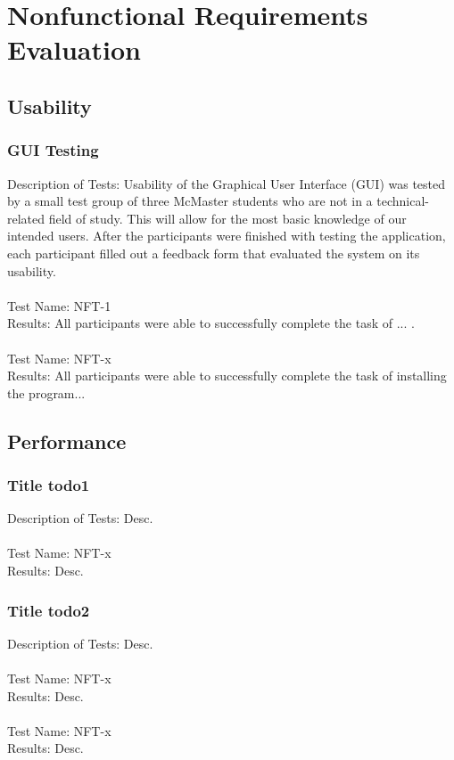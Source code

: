 \documentclass[12pt, titlepage]{article}
\begin{document}
\section{Nonfunctional Requirements Evaluation}

\subsection{Usability}

	\subsubsection{GUI Testing}
	
	Description of Tests: Usability of the Graphical User Interface (GUI) was tested by a small test group of three McMaster students who are not in a technical-related field of study. This will allow for the most basic knowledge of our intended users. After the participants were finished with testing the application, each participant filled out a feedback form that evaluated the system on its usability.\\
	\\
	Test Name: NFT-1\\
	Results: All participants were able to successfully complete the task of ... .\\
	\\		
	Test Name: NFT-x\\
	Results: All participants were able to successfully complete the task of installing the program...

		
\subsection{Performance}
	\subsubsection{Title todo1}
	Description of Tests: Desc.\\
	\\
	Test Name: NFT-x\\
	Results: Desc.
	
	
	\subsubsection{Title todo2}
	
	Description of Tests: Desc.\\
	\\
	Test Name: NFT-x\\
	Results: Desc. \\
	\\
	Test Name: NFT-x\\
	Results: Desc.
	
\end{document}
